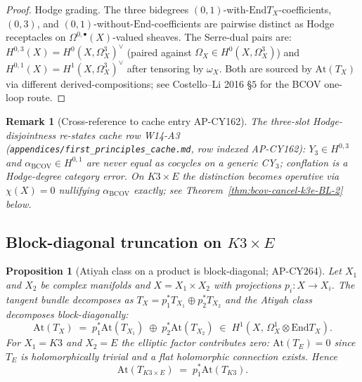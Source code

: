 \documentclass[11pt]{article}
\newtheorem{proposition}[theorem]{Proposition}
\newtheorem{remark}[theorem]{Remark}
\providecommand{\At}{\mathrm{At}}
\providecommand{\End}{\mathrm{End}}
\providecommand{\BCOV}{\mathrm{BCOV}}
\providecommand{\Om}{\Omega}
\begin{document}
\begin{proof}
Hodge grading. The three bidegrees $(0,1)$-with-$\End T_X$-coefficients,
$(0, 3)$, and $(0, 1)$-without-$\End$-coefficients are pairwise
distinct as Hodge receptacles on $\Om^{0, \bullet}(X)$-valued sheaves.
The Serre-dual pairs are: $H^{0, 3}(X) = H^0(X, \Om^3_X)^\vee$ (paired
against $\Om_X \in H^0(X, \Om^3_X)$) and $H^{0, 1}(X) =
H^1(X, \Om^3_X)^\vee$ after tensoring by $\omega_X$. Both are sourced
by $\At(T_X)$ via different derived-compositions; see Costello--Li 2016
\S$5$ for the BCOV one-loop route.
\end{proof}

\begin{remark}[Cross-reference to cache entry AP-CY162]
The three-slot Hodge-disjointness re-states cache row W14-A3
(\texttt{appendices/first\_principles\_cache.md}, row indexed
AP-CY162): $Y_3 \in H^{0, 3}$ and $\alpha_\BCOV \in H^{0, 1}$ are
\emph{never} equal as cocycles on a generic CY$_3$; conflation is a
Hodge-degree category error. On $K3 \times E$ the distinction becomes
operative via $\chi(X) = 0$ nullifying $\alpha_\BCOV$ exactly;
see Theorem~\ref{thm:bcov-cancel-k3e-BL-2} below.
\end{remark}

\subsection{Block-diagonal truncation on $K3 \times E$}

\begin{proposition}[Atiyah class on a product is block-diagonal; AP-CY264]
\label{prop:atiyah-block-diagonal-k3e-BL-2}
Let $X_1$ and $X_2$ be complex manifolds and $X = X_1 \times X_2$ with
projections $p_i \colon X \to X_i$. The tangent bundle decomposes as
$T_X = p_1^* T_{X_1} \oplus p_2^* T_{X_2}$ and the Atiyah class decomposes
block-diagonally:
\[
  \At(T_X)
  \;=\; p_1^* \At(T_{X_1}) \;\oplus\; p_2^* \At(T_{X_2})
  \;\in\; H^1(X,\, \Om^1_X \otimes \End T_X).
\]
For $X_1 = K3$ and $X_2 = E$ the elliptic factor contributes zero:
$\At(T_E) = 0$ since $T_E$ is holomorphically trivial and a flat
holomorphic connection exists. Hence
\[
  \At(T_{K3 \times E}) \;=\; p_1^* \At(T_{K3}).
\]
\end{proposition}
\end{document}
